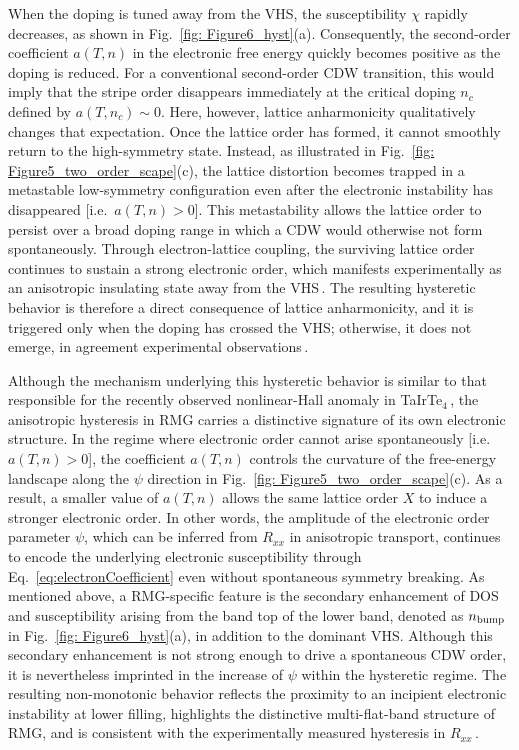 \documentclass[aps,prx,article,twocolumn,amsmath,amssymb,superscriptaddress,longbibliography]{revtex4-2}
\begin{document}
When the doping is tuned away from the VHS, the susceptibility $\chi$ rapidly decreases, as shown in Fig.~\ref{fig: Figure6_hyst}(a). Consequently, the second-order coefficient $a(T,n)$ in the electronic free energy quickly becomes positive as the doping is reduced. For a conventional second-order CDW transition, this would imply that the stripe order disappears immediately at the critical doping $n_c$ defined by $a(T,n_c)\sim 0$. Here, however, lattice anharmonicity qualitatively changes that expectation. Once the lattice order has formed, it cannot smoothly return to the high-symmetry state. Instead, as illustrated in Fig.~\ref{fig: Figure5_two_order_scape}(c), the lattice distortion becomes trapped in a metastable low-symmetry configuration even after the electronic instability has disappeared [i.e.~$a(T,n)> 0$]. This metastability allows the lattice order to persist over a broad doping range in which a CDW would otherwise not form spontaneously. Through electron-lattice coupling, the surviving lattice order continues to sustain a strong electronic order, which manifests experimentally as an anisotropic insulating state away from the VHS\,\cite{zhao2026hysteretical}. The resulting hysteretic behavior is therefore a direct consequence of lattice anharmonicity, and it is triggered only when the doping has crossed the VHS; otherwise, it does not emerge, in agreement experimental observations\,\cite{zhao2026hysteretical}.

Although the mechanism underlying this hysteretic behavior is similar to that responsible for the recently observed nonlinear-Hall anomaly in TaIrTe$_4$\,\cite{tang2026bistable}, the anisotropic hysteresis in RMG carries a distinctive signature of its own electronic structure. In the regime where electronic order cannot arise spontaneously [i.e.~$a(T,n)> 0$], the coefficient $a(T,n)$ controls the curvature of the free-energy landscape along the $\psi$ direction in Fig.~\ref{fig: Figure5_two_order_scape}(c). As a result, a smaller value of $a(T,n)$ allows the same lattice order $X$ to induce a stronger electronic order. In other words, the amplitude of the electronic order parameter $\psi$, which can be inferred from $R_{xx}$ in anisotropic transport, continues to encode the underlying electronic susceptibility through Eq.~\eqref{eq:electronCoefficient} even without spontaneous symmetry breaking. As mentioned above, a RMG-specific feature is the secondary enhancement of DOS and susceptibility arising from the band top of the lower band, denoted as $n_{\rm bump}$ in Fig.~\ref{fig: Figure6_hyst}(a), in addition to the dominant VHS. Although this secondary enhancement is not strong enough to drive a spontaneous CDW order, it is nevertheless imprinted in the increase of $\psi$ within the hysteretic regime. The resulting non-monotonic behavior reflects the proximity to an incipient electronic instability at lower filling, highlights the distinctive multi-flat-band structure of RMG, and is consistent with the experimentally measured hysteresis in $R_{xx}$\,\cite{zhao2026hysteretical}.
\end{document}
